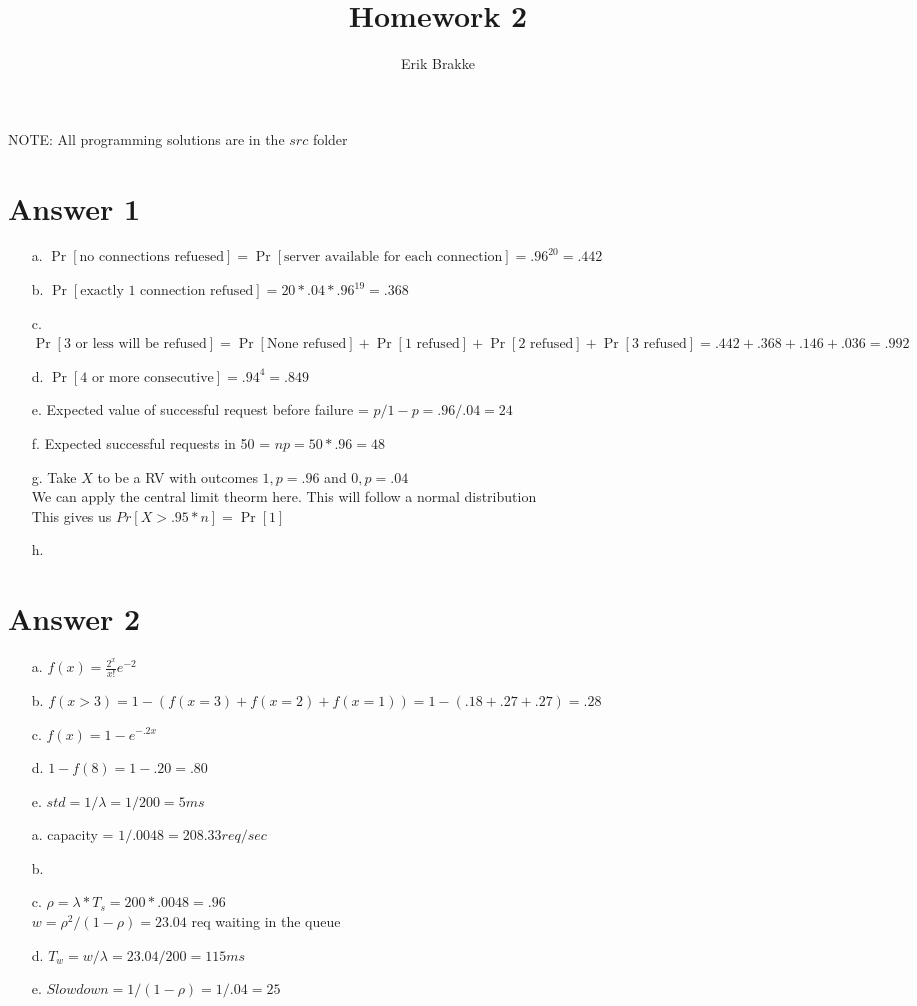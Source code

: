 \documentclass[11pt]{article}
\theoremstyle{definition}
\begin{document}
\title{Homework 2}
\author{Erik Brakke}
\maketitle

\thispagestyle{fancy}
 
NOTE: All programming solutions are in the $src$ folder
\section*{Answer 1}
\begin{enumerate}
	\item[a.] $\Pr[\text{no connections refuesed}] = \Pr[\text{server available for each connection}] = .96^{20} = .442$
	\item[b.] $\Pr[\text{exactly 1 connection refused}] = 20 * .04 * .96^{19} = .368$
	\item[c.] $\Pr[\text{3 or less will be refused}] = \Pr[\text{None refused}] + \Pr[\text{1 refused}] + \Pr[\text{2 refused}] + \Pr[\text{3 refused}] = .442 + .368 + .146 + .036 = .992$
	\item[d.] $\Pr[\text{4 or more consecutive}] = .94 ^ 4 = .849$
	\item[e.] Expected value of successful request before failure = $p / 1-p = .96 / .04 = 24$
	\item[f.] Expected successful requests in 50 = $np = 50 * .96 = 48$
	\item[g.] Take $X$ to be a RV with outcomes $1, p = .96$ and $0, p = .04$\\
	We can apply the central limit theorm here.  This will follow a normal distribution\\
	This gives us $Pr[X > .95*n] = \Pr[1]$
	\item[h.] 
\end{enumerate}

\section*{Answer 2}
\begin{enumerate}
	\item[a.] $f(x) = \frac{2^x}{x!}e^{-2}$
	\item[b.] $f(x > 3) = 1 - (f(x = 3) + f(x=2) + f(x=1)) = 1 - (.18 + .27 + .27) = .28$
	\item[c.] $f(x) = 1 - e^{-.2x}$
	\item[d.] $1 - f(8) = 1 - .20 = .80$
	\item[e.] $std = 1/\lambda = 1 / 200 = 5 ms$
	\newline
	\item[a.] capacity = $1 / .0048 = 208.33 req/sec$
	\item[b.] 
	\item[c.] $\rho = \lambda * T_s = 200 * .0048 = .96$\\
	$w = \rho^2/(1-\rho) = 23.04$ req waiting in the queue
	\item[d.] $T_w = w/\lambda = 23.04 / 200 = 115ms$
	\item[e.] $Slowdown = 1/(1-\rho) = 1/.04 = 25$ 
\end{enumerate}
\end{document}
